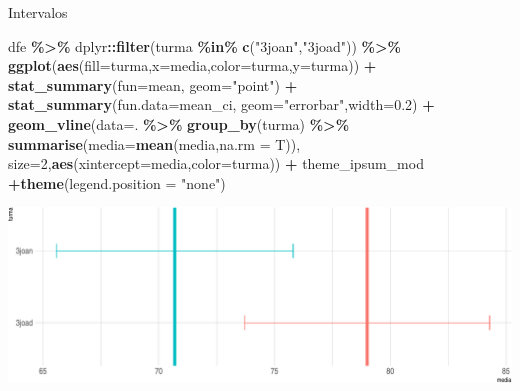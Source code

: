 \documentclass[
  9pt,
  ignorenonframetext,
  aspectratio=169]{beamer}
\newenvironment{Shaded}{\begin{snugshade}}{\end{snugshade}}
\newcommand{\DataTypeTok}[1]{\textcolor[rgb]{0.13,0.29,0.53}{#1}}
\newcommand{\DecValTok}[1]{\textcolor[rgb]{0.00,0.00,0.81}{#1}}
\newcommand{\FloatTok}[1]{\textcolor[rgb]{0.00,0.00,0.81}{#1}}
\newcommand{\KeywordTok}[1]{\textcolor[rgb]{0.13,0.29,0.53}{\textbf{#1}}}
\newcommand{\NormalTok}[1]{#1}
\newcommand{\OperatorTok}[1]{\textcolor[rgb]{0.81,0.36,0.00}{\textbf{#1}}}
\newcommand{\StringTok}[1]{\textcolor[rgb]{0.31,0.60,0.02}{#1}}
\begin{document}
\begin{frame}[fragile]{Intervalos}
\protect\hypertarget{intervalos}{}
\begin{Shaded}
\begin{Highlighting}[]
\NormalTok{dfe }\OperatorTok{\%\textgreater{}\%}\StringTok{ }\NormalTok{dplyr}\OperatorTok{::}\KeywordTok{filter}\NormalTok{(turma }\OperatorTok{\%in\%}\StringTok{ }\KeywordTok{c}\NormalTok{(}\StringTok{"3joan"}\NormalTok{,}\StringTok{"3joad"}\NormalTok{)) }\OperatorTok{\%\textgreater{}\%}\StringTok{ }
\StringTok{  }\KeywordTok{ggplot}\NormalTok{(}\KeywordTok{aes}\NormalTok{(}\DataTypeTok{fill=}\NormalTok{turma,}\DataTypeTok{x=}\NormalTok{media,}\DataTypeTok{color=}\NormalTok{turma,}\DataTypeTok{y=}\NormalTok{turma)) }\OperatorTok{+}
\StringTok{  }\KeywordTok{stat\_summary}\NormalTok{(}\DataTypeTok{fun=}\NormalTok{mean, }\DataTypeTok{geom=}\StringTok{"point"}\NormalTok{) }\OperatorTok{+}\StringTok{ }
\StringTok{  }\KeywordTok{stat\_summary}\NormalTok{(}\DataTypeTok{fun.data=}\NormalTok{mean\_ci, }\DataTypeTok{geom=}\StringTok{"errorbar"}\NormalTok{,}\DataTypeTok{width=}\FloatTok{0.2}\NormalTok{) }\OperatorTok{+}
\StringTok{  }\KeywordTok{geom\_vline}\NormalTok{(}\DataTypeTok{data=}\NormalTok{. }\OperatorTok{\%\textgreater{}\%}\StringTok{ }\KeywordTok{group\_by}\NormalTok{(turma) }\OperatorTok{\%\textgreater{}\%}\StringTok{ }\KeywordTok{summarise}\NormalTok{(}\DataTypeTok{media=}\KeywordTok{mean}\NormalTok{(media,}\DataTypeTok{na.rm =}\NormalTok{ T)),}
             \DataTypeTok{size=}\DecValTok{2}\NormalTok{,}\KeywordTok{aes}\NormalTok{(}\DataTypeTok{xintercept=}\NormalTok{media,}\DataTypeTok{color=}\NormalTok{turma)) }\OperatorTok{+}\StringTok{ }
\StringTok{  }\NormalTok{theme\_ipsum\_mod }\OperatorTok{+}\KeywordTok{theme}\NormalTok{(}\DataTypeTok{legend.position =} \StringTok{"none"}\NormalTok{)}
\end{Highlighting}
\end{Shaded}

\includegraphics{aula_11_files/figure-beamer/unnamed-chunk-5-1.pdf}
\end{frame}
\end{document}
